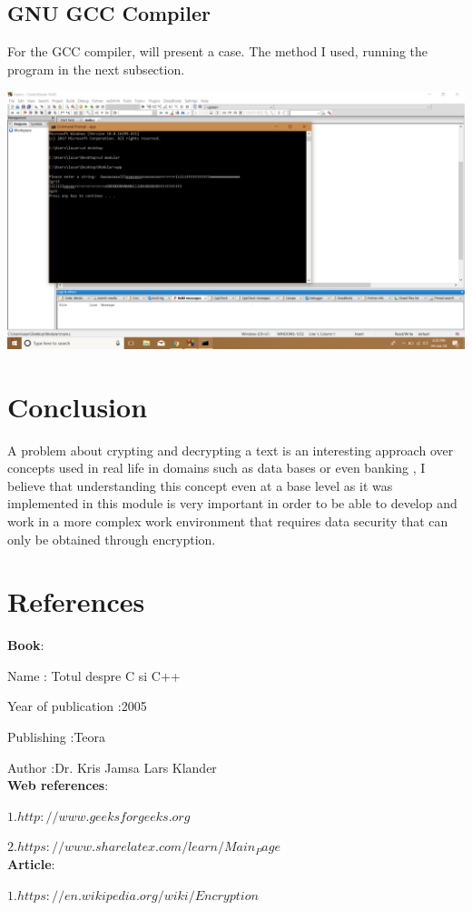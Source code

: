 \documentclass[12]{article}
\begin{document}
\subsection{GNU GCC Compiler}
For the GCC compiler, will present a case. The method I used, running the program in the next subsection. 

\includegraphics[scale=0.3]{pro.jpg} 



\newpage
\section{Conclusion}
\textbf{} 

A problem about crypting and decrypting a text is an interesting approach over concepts used in real life in domains such as data bases or even banking , I believe that understanding this concept even at a base level  as it was implemented in this module is very important in order to be able to develop and work in a more complex work environment that requires data security that can only be obtained through encryption.



\newpage
\section{References}

\textbf{Book}:

Name : Totul despre C si C++ 

Year of publication  :2005

Publishing :Teora

Author :Dr. Kris Jamsa Lars Klander\\
\textbf{Web references}:

$1.http://www.geeksforgeeks.org$

$2. https://www.sharelatex.com/learn/Main_Page$\\
\textbf{Article}:

$1. https://en.wikipedia.org/wiki/Encryption$
\end{document}
